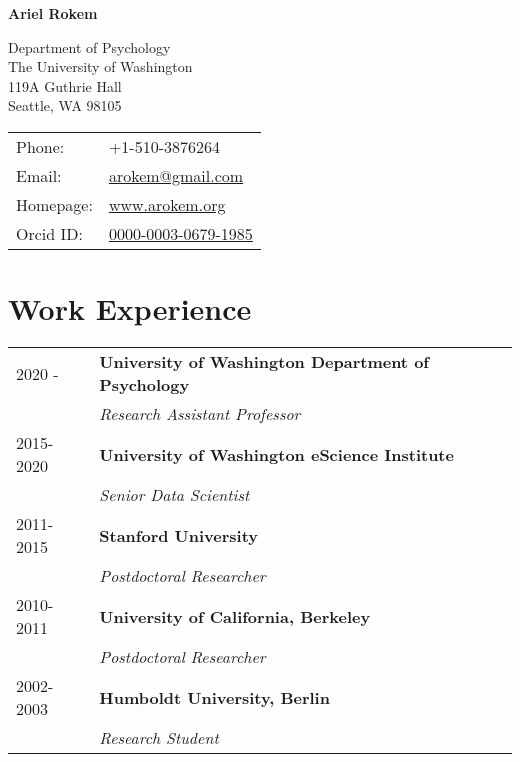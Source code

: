 \documentclass[11pt,fullpage]{article}
\def\name{Ariel Rokem}
\begin{document}
%

\centerline{\Large \bf \name}

\vspace{0.25in}

\begin{minipage}{0.50\linewidth}
  Department of Psychology\\
  The University of Washington\\
  119A Guthrie Hall\\
  Seattle, WA 98105\\
\end{minipage}
\begin{minipage}{0.50\linewidth}
  \begin{tabular}{ll}
    Phone: & +1-510-3876264 \\
    Email: & \href{mailto:arokem@gmail.com}{arokem@gmail.com} \\
    Homepage: & \href{http://arokem.org/}{www.arokem.org} \\
    Orcid ID: & \href{http://orcid.org/0000-0003-0679-1985}{0000-0003-0679-1985} \\
  \end{tabular}
\end{minipage}

\section*{Work Experience}
\begin{tabular}{ll}

  2020 - & {\bf University of Washington Department of Psychology}\\
  & \emph{Research Assistant Professor}\\
  2015-2020 & {\bf University of Washington eScience Institute}\\
  & \emph{Senior Data Scientist}\\
  2011-2015 & {\bf Stanford University}\\
  & \emph{Postdoctoral Researcher}\\
  2010-2011 & {\bf University of California, Berkeley}\\
  & \emph{Postdoctoral Researcher}\\
  2002-2003 & {\bf Humboldt University, Berlin}\\
  & \emph{Research Student}\\

\end{tabular}
\end{document}
